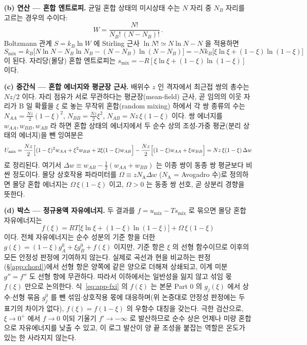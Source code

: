 \documentclass[11pt,a4paper]{article}
\begin{document}
\textbf{(b) 연산 --- 혼합 엔트로피.} 균일 혼합 상태의 미시상태 수는 $N$ 자리 중 $N_B$ 자리를 고르는
경우의 수이다:
\begin{equation}
W=\frac{N!}{N_B!\,(N-N_B)!}\,.
\label{eq:app-W}
\end{equation}
Boltzmann 관계 $S=k_B\ln W$ 에 Stirling 근사 $\ln N!\simeq N\ln N-N$ 을 적용하면
\begin{equation}
S_\mathrm{mix}=k_B\bigl[N\ln N-N_B\ln N_B-(N-N_B)\ln(N-N_B)\bigr]
=-Nk_B\bigl[\xi\ln\xi+(1-\xi)\ln(1-\xi)\bigr]
\label{eq:app-Smix}
\end{equation}
이 된다. 자리당(몰당) 혼합 엔트로피는 $s_\mathrm{mix}=-R[\xi\ln\xi+(1-\xi)\ln(1-\xi)]$ 이다.

\textbf{(c) 중간식 --- 혼합 에너지와 평균장 근사.} 배위수 $z$ 인 격자에서 최근접 쌍의 총수는 $Nz/2$
이다. 자리 점유가 서로 무관하다는 평균장(mean-field) 근사, 곧 임의의 이웃 자리가 B 일 확률을 $\xi$ 로
놓는 무작위 혼합(random mixing) 하에서 각 쌍 종류의 수는 $N_{AA}=\tfrac{Nz}{2}(1-\xi)^2$,
$N_{BB}=\tfrac{Nz}{2}\xi^2$, $N_{AB}=Nz\,\xi(1-\xi)$ 이다. 쌍 에너지를 $w_{AA},w_{BB},w_{AB}$ 라 하면
혼합 상태의 에너지에서 두 순수 상의 조성-가중 평균(분리 상태의 에너지)을 뺀 잉여분은
\begin{equation}
U_\mathrm{mix}
=\frac{Nz}{2}\Bigl[(1-\xi)^2w_{AA}+\xi^2 w_{BB}+2\xi(1-\xi)w_{AB}\Bigr]
-\frac{Nz}{2}\Bigl[(1-\xi)w_{AA}+\xi w_{BB}\Bigr]
=Nz\,\xi(1-\xi)\,\Delta w
\label{eq:app-Umix}
\end{equation}
로 정리된다. 여기서 $\Delta w\equiv w_{AB}-\tfrac12(w_{AA}+w_{BB})$ 는 이종 쌍이 동종 쌍 평균보다
비싼 정도이다. 몰당 상호작용 파라미터를 $\Omega\equiv z N_\mathrm{A}\Delta w$ ($N_\mathrm{A}$ =
Avogadro 수)로 정의하면 몰당 혼합 에너지는 $\Omega\,\xi(1-\xi)$ 이고, $\Omega>0$ 는 동종 쌍 선호,
곧 상분리 경향을 뜻한다.

\textbf{(d) 박스 --- 정규용액 자유에너지.} 두 결과를 $f=u_\mathrm{mix}-Ts_\mathrm{mix}$ 로 묶으면
몰당 혼합 자유에너지는
\begin{equation}
\boxed{\;f(\xi)=RT\bigl[\xi\ln\xi+(1-\xi)\ln(1-\xi)\bigr]+\Omega\,\xi(1-\xi)\;}
\label{eq:app-fxi}
\end{equation}
이다. 전체 자유에너지는 순수 성분의 기준 항을 더한 $g(\xi)=(1-\xi)g_A^0+\xi g_B^0+f(\xi)$ 이지만,
기준 항은 $\xi$ 의 선형 함수이므로 이후의 모든 안정성 판정에 기여하지 않는다. 실제로 곡선과 현을
비교하는 판정(\S\ref{app:chord})에서 선형 항은 양쪽에 같은 양으로 더해져 상쇄되고, 이계 미분 $g''=f''$
도 선형 항에 무관하다. 따라서 이하에서는 일반성을 잃지 않고 섞임 몫 $f(\xi)$ 만으로 논의한다.
식~\eqref{eq:app-fxi} 의 $f(\xi)$ 는 본문 Part 0 의 $g_j(\xi)$ 에서 상수$\cdot$선형 묶음 $g_j^0$ 를 뺀
섞임$\cdot$상호작용 몫에 대응하며(위 논증대로 안정성 판정에는 두 표기의 차이가 없다),
$f(\xi)=f(1-\xi)$ 의 우함수 대칭을 갖는다. 극한 검산으로, $\xi\to0^+$ 에서 $f\to0$ 이되 기울기 $f'\to-\infty$ 로 발산하므로 순수 상은
언제나 미량 혼합으로 자유에너지를 낮출 수 있고, 이 로그 발산이 양 끝 조성을 붙잡는 역할은 온도가
있는 한 사라지지 않는다.
\end{document}
